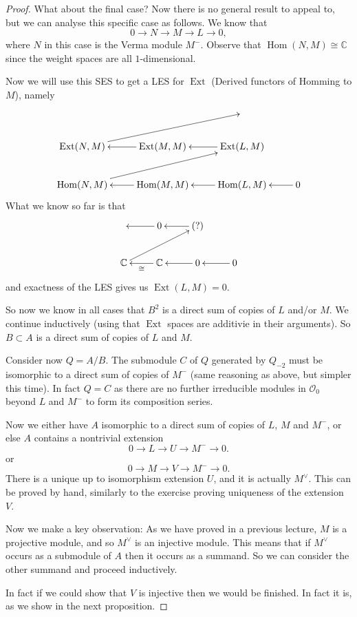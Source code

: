 \documentclass[12pt]{article}
\theoremstyle{plain}
\theoremstyle{definition}
\numberwithin{equation}{section}
\DeclareMathOperator{\Ext}{Ext}
\DeclareMathOperator{\Hom}{Hom}
\newcommand{\C}{\mathbb{C}}
\newcommand{\OO}{\mathcal{O}}
\begin{document}
\begin{proof}
What about the final case? Now there is no general result to appeal to, but we can analyse this specific case as follows. We know that
\[
0 \rightarrow N \rightarrow M \rightarrow L \rightarrow 0,
\]
where $N$ in this case is the Verma module $M^-$. Observe that $\Hom(N, M) \cong \C$ since the weight spaces are all $1$-dimensional.

Now we will use this SES to get a LES for $\Ext$ (Derived functors of Homming to $M$), namely
\begin{align*}
\xymatrix{
 &  &  \\
%
\Ext(N, M) \ar@{->}[urr] & \Ext(M, M) \ar@{->}[l] & \Ext(L, M) \ar@{->}[l] &  \\
%
\Hom(N, M) \ar@{->}[urr] & \Hom(M, M) \ar@{->}[l] & \Hom(L, M) \ar@{->}[l] & 0  \ar@{->}[l] \\
}
\end{align*}
What we know so far is that
\begin{align*}
\xymatrix{
 & 0 \ar@{->}[l] & (?) \ar@{->}[l] &  \\
%
\C \ar@{->}[urr] & \C \ar@{->}[l]^{\cong} & 0 \ar@{->}[l] & 0  \ar@{->}[l] \\
}
\end{align*}
and exactness of the LES gives us $\Ext(L, M) = 0$.

So now we know in all cases that $B^2$ is a direct sum of copies of $L$ and/or $M$. We continue inductively (using that $\Ext$ spaces are additivie in their arguments). So $B \subset A$ is a direct sum of copies of $L$ and $M$.

Consider now $Q = A / B$. The submodule $C$ of $Q$ generated by $Q_{-2}$ must be isomorphic to a direct sum of copies of $M^-$ (same reasoning as above, but simpler this time). In fact $Q = C$ as there are no further irreducible modules in $\OO_0$ beyond $L$ and $M^-$ to form its composition series.

Now we either have $A$ isomorphic to a direct sum of copies of $L$, $M$ and $M^-$, or else $A$ contains a nontrivial extension
\[
0 \rightarrow L \rightarrow U \rightarrow M^- \rightarrow 0.
\]
or
\[
0 \rightarrow M \rightarrow V \rightarrow M^- \rightarrow 0.
\]
There is a unique up to isomorphism extension $U$, and it is actually $M^\vee$. This can be proved by hand, similarly to the exercise proving uniqueness of the extension $V$.

Now we make a key observation: As we have proved in a previous lecture,  $M$ is a projective module, and so $M^\vee$ is an injective module. This means that if $M^\vee$ occurs as a submodule of $A$ then it occurs as a summand. So we can consider the other summand and proceed inductively.

In fact if we could show that $V$ is injective then we would be finished. In fact it is, as we show in the next proposition.
\end{proof}
\end{document}
